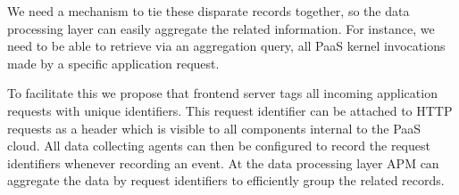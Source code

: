\documentclass[11pt]{article}
\begin{document}
We need a mechanism to tie these disparate records together, so the data processing layer can easily
aggregate the related information. For instance, we need to be able to retrieve via an
aggregation query, all PaaS kernel invocations made by a specific application request.

To facilitate this we propose that frontend server tags all incoming application requests with unique identifiers.
This request identifier can be attached to HTTP requests as a header which is visible to all components 
internal to the PaaS cloud. All data collecting agents can then be configured to record the request identifiers
whenever recording an event. At the data processing layer APM can aggregate the data by request identifiers
to efficiently group the related records.
\end{document}
